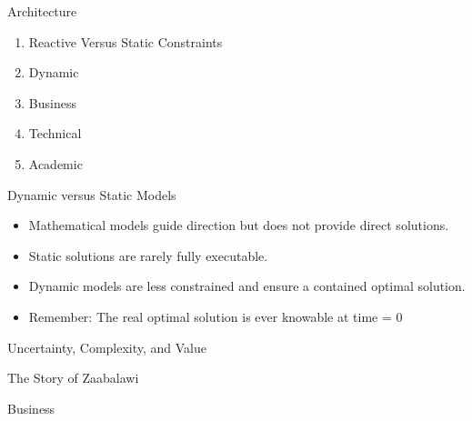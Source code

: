 \documentclass{beamer}
\begin{document}
\begin{frame}[t]{Architecture}
\end{frame}

\begin{frame}[t]{}
    \begin{block}{}
        \begin{enumerate}
			\item Reactive Versus Static Constraints
			\item Dynamic
            \item Business
            \item Technical
            \item Academic
        \end{enumerate}
    \end{block}
\end{frame}

\begin{frame}[t]{}
    \begin{block}{Dynamic versus Static Models}
			
			\drawReactiveConstraints{}

		\begin{itemize}
			\item Mathematical models guide direction but does not provide direct solutions.
			\item Static solutions are rarely fully executable.
			\item Dynamic models are less constrained and ensure a contained optimal solution.
			\item Remember: The real optimal solution is ever knowable at time = 0
		\end{itemize}
    \end{block}
\end{frame}

\begin{frame}[t]{}
    \begin{block}{Uncertainty, Complexity, and Value}
		
    \end{block}
\end{frame}

\begin{frame}[t]{}
    \begin{block}{The Story of Zaabalawi}
    \end{block}
\end{frame}

\begin{frame}[t]{}
    \begin{block}{}
		
    \end{block}
\end{frame}

\begin{frame}{}
    \begin{block}{Business}
    \end{block}
\end{frame}
\end{document}
